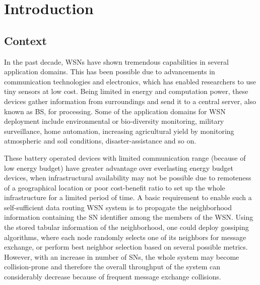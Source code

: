 
\chapter{Introduction}\label{ch:introduction}

\section{Context}


In the past decade, \acp{WSN} have shown tremendous capabilities in several application domains. This has been possible due to advancements in communication technologies and electronics, which has enabled researchers to use tiny sensors at low cost. Being limited in energy and computation power, these devices gather information from surroundings and send it to a central server, also known as \ac{BS}, for processing. Some of the application domains for \ac{WSN} deployment include environmental or bio-diversity monitoring, military surveillance, home automation, increasing agricultural yield by monitoring atmospheric and soil conditions, disaster-assistance and so on.

\par
These battery operated devices with limited communication range (because of low energy budget) have greater advantage over everlasting energy budget devices, when infrastructural availability may not be possible due to remoteness of a geographical location or poor cost-benefit ratio to set up the whole infrastructure for a limited period of time. A basic requirement to enable such a self-sufficient data routing \ac{WSN} system is to propagate the neighborhood information containing the \ac{SN} identifier among the members of the \ac{WSN}. Using the stored tabular information of the neighborhood, one could deploy gossiping algorithms, where each node randomly selects one of its neighbors for message exchange, or perform best neighbor selection based on several possible metrics. However, with an increase in number of \acp{SN}, the whole system may become collision-prone and therefore the overall throughput of the system can considerably decrease because of frequent message exchange collisions. 

